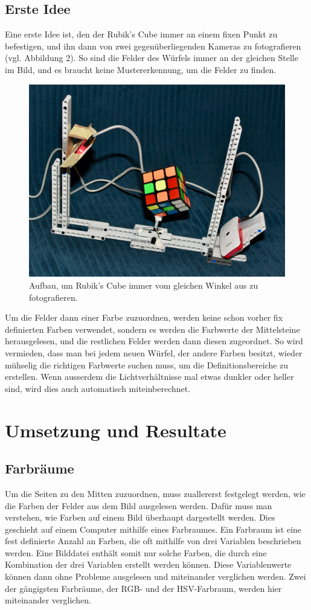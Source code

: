 \documentclass[a4paper, 12pt]{article}
\begin{document}
\subsection{Erste Idee}
Eine erste Idee ist, den der Rubik's Cube immer an einem fixen Punkt zu befestigen, und ihn dann von zwei gegenüberliegenden Kameras zu fotografieren (vgl. Abbildung 2). So sind die Felder des Würfels immer an der gleichen Stelle im Bild, und es braucht keine Mustererkennung, um die Felder zu finden.
\begin{figure}[h]
\includegraphics[scale=0.25]{Aufbau_Bild}
\caption{Aufbau, um Rubik's Cube immer vom gleichen Winkel aus zu fotografieren.}
\end{figure}
\newline
Um die Felder dann einer Farbe zuzuordnen, werden keine schon vorher fix definierten Farben verwendet, sondern es werden die Farbwerte der Mittelsteine herausgelesen, und die restlichen Felder werden dann diesen zugeordnet. So wird vermieden, dass man bei jedem neuen Würfel, der andere Farben besitzt, wieder mühselig die richtigen Farbwerte suchen muss, um die Definitionsbereiche zu erstellen. Wenn ausserdem die Lichtverhältnisse  mal etwas dunkler oder heller sind, wird dies auch automatisch miteinberechnet. 
\newpage
\section{Umsetzung und Resultate}
\subsection{Farbräume}
Um die Seiten zu den Mitten zuzuordnen, muss zuallererst festgelegt werden, wie die Farben der Felder aus dem Bild ausgelesen werden. Dafür muss man verstehen, wie Farben auf einem Bild überhaupt dargestellt werden. Dies geschieht auf einem Computer mithilfe eines Farbraumes. Ein Farbraum ist eine fest definierte Anzahl an Farben, die oft mithilfe von drei Variablen beschrieben werden. Eine Bilddatei enthält somit nur solche Farben, die durch eine Kombination der drei Variablen erstellt werden können. \cite{Farbraum} Diese Variablenwerte können dann ohne Probleme ausgelesen und miteinander verglichen werden. Zwei der gängigsten Farbräume, der RGB- und der HSV-Farbraum, werden hier miteinander verglichen. 
\end{document}
